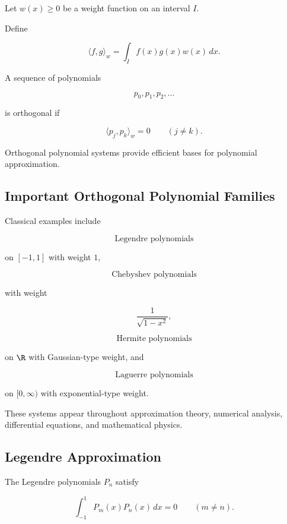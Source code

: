 Let \(w(x)\geq0\) be a weight function on an interval \(I\).

Define

\[
\boxed{
\langle f,g\rangle_w
=
\int_I
f(x)g(x)w(x)\,dx.
}
\]

A sequence of polynomials

\[
p_0,p_1,p_2,\ldots
\]

is orthogonal if

\[
\boxed{
\langle p_j,p_k\rangle_w=0
\qquad
(j\neq k).
}
\]

Orthogonal polynomial systems provide efficient bases for polynomial
approximation.

\subsection{Important Orthogonal Polynomial Families}
\label{subsec:orthogonal-polynomial-families}

Classical examples include

\[
\boxed{
\text{Legendre polynomials}
}
\]

on \([-1,1]\) with weight \(1\),

\[
\boxed{
\text{Chebyshev polynomials}
}
\]

with weight

\[
\frac{1}{\sqrt{1-x^2}},
\]

\[
\boxed{
\text{Hermite polynomials}
}
\]

on \(\R\) with Gaussian-type weight, and

\[
\boxed{
\text{Laguerre polynomials}
}
\]

on \([0,\infty)\) with exponential-type weight.

These systems appear throughout approximation theory, numerical analysis,
differential equations, and mathematical physics.

\subsection{Legendre Approximation}
\label{subsec:legendre-approximation}

The Legendre polynomials \(P_n\) satisfy

\[
\boxed{
\int_{-1}^{1}
P_m(x)P_n(x)\,dx
=
0
\qquad
(m\neq n).
}
\]

